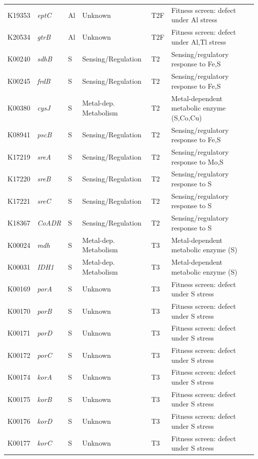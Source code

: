 \documentclass[11pt]{article}
\begin{document}
\begin{longtable}{lllllp{4.8cm}}
K19353 & \textit{eptC} & Al & Unknown & T2F & Fitness screen: defect under Al stress \\
K20534 & \textit{gtrB} & Al & Unknown & T2F & Fitness screen: defect under Al,Tl stress \\
K00240 & \textit{sdhB} & S & Sensing/Regulation & T2 & Sensing/regulatory response to Fe,S \\
K00245 & \textit{frdB} & S & Sensing/Regulation & T2 & Sensing/regulatory response to Fe,S \\
K00380 & \textit{cysJ} & S & Metal-dep. Metabolism & T2 & Metal-dependent metabolic enzyme (S,Co,Cu) \\
K08941 & \textit{pscB} & S & Sensing/Regulation & T2 & Sensing/regulatory response to Fe,S \\
K17219 & \textit{sreA} & S & Sensing/Regulation & T2 & Sensing/regulatory response to Mo,S \\
K17220 & \textit{sreB} & S & Sensing/Regulation & T2 & Sensing/regulatory response to S \\
K17221 & \textit{sreC} & S & Sensing/Regulation & T2 & Sensing/regulatory response to S \\
K18367 & \textit{CoADR} & S & Sensing/Regulation & T2 & Sensing/regulatory response to S \\
K00024 & \textit{mdh} & S & Metal-dep. Metabolism & T3 & Metal-dependent metabolic enzyme (S) \\
K00031 & \textit{IDH1} & S & Metal-dep. Metabolism & T3 & Metal-dependent metabolic enzyme (S) \\
K00169 & \textit{porA} & S & Unknown & T3 & Fitness screen: defect under S stress \\
K00170 & \textit{porB} & S & Unknown & T3 & Fitness screen: defect under S stress \\
K00171 & \textit{porD} & S & Unknown & T3 & Fitness screen: defect under S stress \\
K00172 & \textit{porC} & S & Unknown & T3 & Fitness screen: defect under S stress \\
K00174 & \textit{korA} & S & Unknown & T3 & Fitness screen: defect under S stress \\
K00175 & \textit{korB} & S & Unknown & T3 & Fitness screen: defect under S stress \\
K00176 & \textit{korD} & S & Unknown & T3 & Fitness screen: defect under S stress \\
K00177 & \textit{korC} & S & Unknown & T3 & Fitness screen: defect under S stress \\

\end{longtable}
\end{document}

